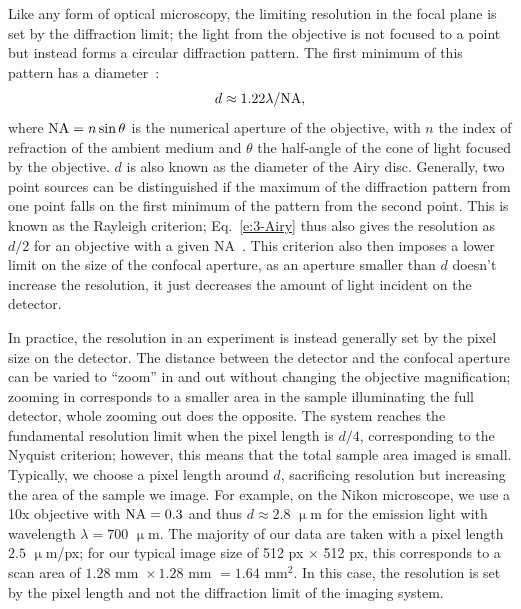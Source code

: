 Like any form of optical microscopy, the limiting resolution in the focal plane is set by the diffraction limit; the light from the objective is not focused to a point but instead forms a circular diffraction pattern.
The first minimum of this pattern has a diameter~\cite{RN314}:
\begin{equation}
d \approx 1.22 \lambda /{\rm NA},\label{e:3-Airy}
\end{equation}
where ${\rm NA} = n \sin \theta$ is the numerical aperture of the objective, with $n$ the index of refraction of the ambient medium and $\theta$ the half-angle of the cone of light focused by the objective.
$d$ is also known as the diameter of the Airy disc.
Generally, two point sources can be distinguished if the maximum of the diffraction pattern from one point falls on the first minimum of the pattern from the second point.
This is known as the Rayleigh criterion; Eq.~\ref{e:3-Airy} thus also gives the resolution as $d/2$ for an objective with a given NA~\cite{RN314}.
This criterion also then imposes a lower limit on the size of the confocal aperture, as an aperture smaller than $d$ doesn't increase the resolution, it just decreases the amount of light incident on the detector.

In practice, the resolution in an experiment is instead generally set by the pixel size on the detector.
The distance between the detector and the confocal aperture can be varied to ``zoom'' in and out without changing the objective magnification; zooming in corresponds to a smaller area in the sample illuminating the full detector, whole zooming out does the opposite.
The system reaches the fundamental resolution limit when the pixel length is $d/4$, corresponding to the Nyquist criterion; however, this means that the total sample area imaged is small.
Typically, we choose a pixel length around $d$, sacrificing resolution but increasing the area of the sample we image.
For example, on the Nikon microscope, we use a 10x objective with ${\rm NA} = 0.3$ and thus $d \approx 2.8$ $\upmu$m for the emission light with wavelength $\lambda = 700$ $\upmu$m.
The majority of our data are taken with a pixel length $2.5$ $\upmu$m/px; for our typical image size of 512 px $\times$ 512 px, this corresponds to a scan area of $1.28\textrm{ mm } \times 1.28\textrm{ mm } = 1.64\textrm{ mm}^2$.
In this case, the resolution is set by the pixel length and not the diffraction limit of the imaging system.


